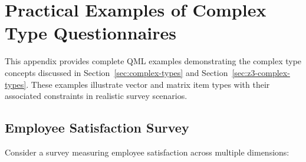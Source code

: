 \chapter{Practical Examples of Complex Type Questionnaires}
\label{ch:appendix-examples}

This appendix provides complete QML examples demonstrating the complex type concepts discussed in Section~\ref{sec:complex-types} and Section~\ref{sec:z3-complex-types}. These examples illustrate vector and matrix item types with their associated constraints in realistic survey scenarios.

\section{Employee Satisfaction Survey}

Consider a survey measuring employee satisfaction across multiple dimensions:

